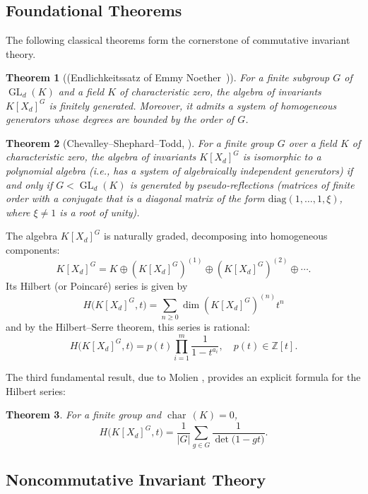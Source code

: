 \documentclass{amsart}[12pt]
\newtheorem{theorem}{Theorem}%
\theoremstyle{definition}
\DeclareMathOperator{\GL}{GL}
\DeclareMathOperator{\charr}{char\,}
\begin{document}
\subsection{Foundational Theorems}

The following classical theorems form the cornerstone of commutative invariant theory.

\begin{theorem}[\rm (Endlichkeitssatz of Emmy Noether~\cite{No1})]
\label{finite generation Noether}
For a finite subgroup $G$ of $\GL_d(K)$ and a field $K$ of characteristic zero, the algebra of invariants $K[X_d]^G$ is finitely generated.
 Moreover, it admits a system of homogeneous generators whose degrees are bounded by the order of $G$.
\end{theorem}

\begin{theorem}[Chevalley--Shephard--Todd, \cite{Che, ShT}]
\label{pseudoreflections}
For a finite group $G$ over a field $K$ of characteristic zero, the algebra of invariants $K[X_d]^G$ is isomorphic to a polynomial algebra
(i.e., has  a system of algebraically independent generators) if and only if $G< \GL_d(K)$ is generated by pseudo-reflections
(matrices of finite order with a conjugate that is a diagonal matrix of the form $\mathrm{diag}(1, \ldots , 1, \xi)$, where $\xi\neq  1$ is a root of unity).
\end{theorem}

The algebra $K[X_d]^G$ is naturally graded, decomposing into homogeneous components:
\[
K[X_d]^G=K\oplus \left(K[X_d]^G\right)^{(1)} \oplus \left(K[X_d]^G\right)^{(2)} \oplus \cdots.
\]
Its Hilbert (or Poincar\'e) series is given by
\[
H\big(K[X_d]^G,t\big)=\sum_{n\geq 0}\dim \left(K[X_d]^G\right)^{(n)}  t^n
\]
and by the Hilbert–Serre theorem, this series is rational:
\[
H\big(K[X_d]^G,t\big) = p(t) \prod_{i=1}^m\frac{1}{1-t^{a_i}},\quad p(t)\in{\mathbb Z}[t].
\]

The third fundamental result, due to Molien \cite{Mo}, provides an explicit formula for the Hilbert series:

\begin{theorem}\label{Molien formula}
For a finite group and $\charr (K)=0$,
\[
H\big(K[X_d]^G,t\big)=\frac{1}{\vert G\vert}\sum_{g\in G}\frac{1}{\det\big(1-gt\big)}.
\]
\end{theorem}

\subsection{Noncommutative Invariant Theory}
\end{document}
